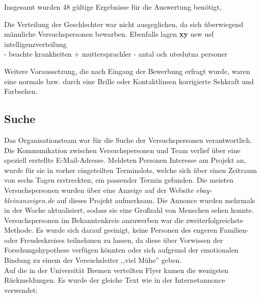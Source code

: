 \documentclass{Bericht}
\begin{document}
Insgesamt wurden 48 gültige Ergebnisse für die Auswertung benötigt, 


Die Verteilung der Geschlechter war nicht ausgeglichen, da sich überwiegend männliche Versuchspersonen bewarben. Ebenfalls lagen \textbf{xy} usw usf intelligenzverteilung \\


- beachte krankheiten + muttersprachler
- antal och uteslutna personer 


Weitere Voraussetzung, die nach Eingang der Bewerbung erfragt wurde, waren eine normale bzw. durch eine Brille oder Kontaktlinsen korrigierte Sehkraft und Farbsehen. 

\subsection{Suche}
Das Organisationsteam war für die Suche der Versuchspersonen verantwortlich. Die Kommunikation zwischen Versuchspersonen und Team verlief über eine speziell erstellte E-Mail-Adresse. Meldeten Personen Interesse am Projekt an, wurde für sie in vorher eingeteilten Terminslots, welche sich über einen Zeitraum von sechs Tagen erstreckten, ein passender Termin gefunden.
Die meisten Versuchspersonen wurden über eine Anzeige auf der Website \textit{ebay-kleinanzeigen.de} auf dieses Projekt aufmerksam. Die Annonce wurden mehrmals in der Woche aktualisiert, sodass sie eine Großzahl von Menschen sehen konnte.\\
Versuchspersonen im Bekanntenkreis anzuwerben war die zweiterfolgreichste Methode. Es wurde sich darauf geeinigt, keine Personen des engeren Familien- oder Freudeskreises teilnehmen zu lassen, da diese über Vorwissen der Forschungshypothese verfügen könnten oder sich aufgrund der emotionalen Bindung zu einem der Versuchsleiter ,,viel Mühe'' geben.\\
Auf die in der Universität Bremen verteilten Flyer kamen die wenigsten Rückmeldungen. Es wurde der gleiche Text wie in der Internetannonce verwendet:\\
\end{document}
